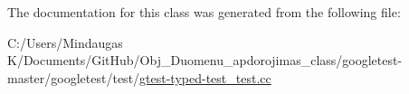 The documentation for this class was generated from the following file\+:\begin{DoxyCompactItemize}
\item 
C\+:/\+Users/\+Mindaugas K/\+Documents/\+Git\+Hub/\+Obj\+\_\+\+Duomenu\+\_\+apdorojimas\+\_\+class/googletest-\/master/googletest/test/\mbox{\hyperlink{googletest-master_2googletest_2test_2gtest-typed-test__test_8cc}{gtest-\/typed-\/test\+\_\+test.\+cc}}\end{DoxyCompactItemize}
